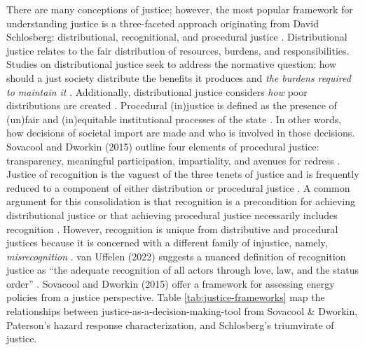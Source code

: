     There are many conceptions of justice; however, the most popular framework
    for understanding justice is a three-faceted approach originating from David
    Schlosberg: distributional, recognitional, and procedural justice
    \cite{schlosberg_2_2007}.
    Distributional justice relates to the fair distribution of resources,
    burdens, and responsibilities. Studies on distributional justice seek to
    address the normative question: how should a just society distribute the
    benefits it produces and \textit{the burdens required to maintain it}
    \cite{brighouse_justice_2004}. Additionally, distributional justice
    considers \textit{how} poor distributions are created
    \cite{schlosberg_2_2007}.
    Procedural (in)justice is defined as the presence of (un)fair and
    (in)equitable institutional processes of the state \cite{schlosberg_2_2007}.
    In other words, how decisions of societal import are made and who is
    involved in those decisions. Sovacool and Dworkin (2015) outline four
    elements of procedural justice: transparency, meaningful participation,
    impartiality, and avenues for redress \cite{sovacool_energy_2015}.    
Justice of recognition is the vaguest of the three tenets of justice and is
    frequently reduced to a component of either distribution or procedural
    justice \cite{schlosberg_2_2007, van_uffelen_revisiting_2022}. A common
    argument for this consolidation is that recognition is a precondition for
    achieving distributional justice or that achieving procedural justice
    necessarily includes recognition \cite{schlosberg_2_2007}. However,
    recognition is unique from distributive and procedural justices because it
    is concerned with a different family of injustice, namely,
    \textit{misrecognition} \cite{van_uffelen_revisiting_2022}. van Uffelen
    (2022) suggests a nuanced definition of recognition justice as ``the
    adequate recognition of all actors through love, law, and the status order''
    \cite{van_uffelen_revisiting_2022}.
Sovacool and Dworkin (2015) offer a framework for assessing energy policies from
a justice perspective. Table \ref{tab:justice-frameworks} map the relationships
between justice-as-a-decision-making-tool from Sovacool \& Dworkin, Paterson's
hazard response characterization, and Schlosberg's triumvirate of justice. 

